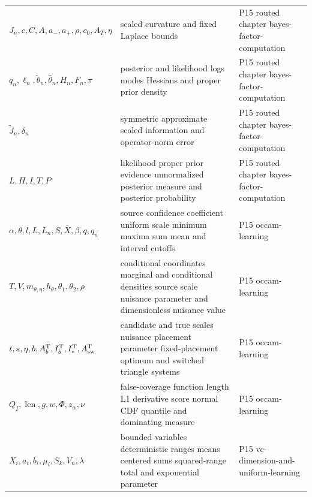 \begin{longtable}{@{}p{}p{}p{}@{}}
\(J_n,\allowbreak c,\allowbreak C,\allowbreak A,\allowbreak a_-,\allowbreak a_+,\allowbreak \rho,\allowbreak c_0,\allowbreak A_T,\allowbreak \eta\) & scaled curvature and fixed Laplace bounds & P15 routed chapter bayes-\allowbreak{}factor-\allowbreak{}computation \\
\(q_n,\allowbreak \ell_n,\allowbreak \widetilde\theta_n,\allowbreak \widehat\theta_n,\allowbreak H_n,\allowbreak F_n,\allowbreak \pi\) & posterior and likelihood logs modes Hessians and proper prior density & P15 routed chapter bayes-\allowbreak{}factor-\allowbreak{}computation \\
\(\widetilde J_n,\allowbreak \delta_n\) & symmetric approximate scaled information and operator-norm error & P15 routed chapter bayes-\allowbreak{}factor-\allowbreak{}computation \\
\(L,\allowbreak \Pi,\allowbreak I,\allowbreak T,\allowbreak P\) & likelihood proper prior evidence unnormalized posterior measure and posterior probability & P15 routed chapter bayes-\allowbreak{}factor-\allowbreak{}computation \\
\(\alpha,\allowbreak \theta,\allowbreak l,\allowbreak L,\allowbreak L_n,\allowbreak S,\allowbreak \bar X,\allowbreak \beta,\allowbreak q,\allowbreak q_n\) & source confidence coefficient uniform scale minimum maxima sum mean and interval cutoffs & P15 occam-\allowbreak{}learning \\
\(T,\allowbreak V,\allowbreak m_{\theta,\eta},\allowbreak h_\theta,\allowbreak \theta_1,\allowbreak \theta_2,\allowbreak \rho\) & conditional coordinates marginal and conditional densities source scale nuisance parameter and dimensionless nuisance value & P15 occam-\allowbreak{}learning \\
\(t,\allowbreak s,\allowbreak \eta,\allowbreak b,\allowbreak A_b^{\rm T},\allowbreak I_b^{\rm T},\allowbreak I_*^{\rm T},\allowbreak A_{\rm sw}^{\rm T}\) & candidate and true scales nuisance placement parameter fixed-placement optimum and switched triangle systems & P15 occam-\allowbreak{}learning \\
\(Q_I,\allowbreak \operatorname{len},\allowbreak g,\allowbreak w,\allowbreak \Phi,\allowbreak z_\alpha,\allowbreak \nu\) & false-coverage function length L1 derivative score normal CDF quantile and dominating measure & P15 occam-\allowbreak{}learning \\
\(X_i,\allowbreak a_i,\allowbreak b_i,\allowbreak \mu_i,\allowbreak S_k,\allowbreak V_n,\allowbreak \lambda\) & bounded variables deterministic ranges means centered sums squared-range total and exponential parameter & P15 vc-\allowbreak{}dimension-\allowbreak{}and-\allowbreak{}uniform-\allowbreak{}learning \\

\end{longtable}
